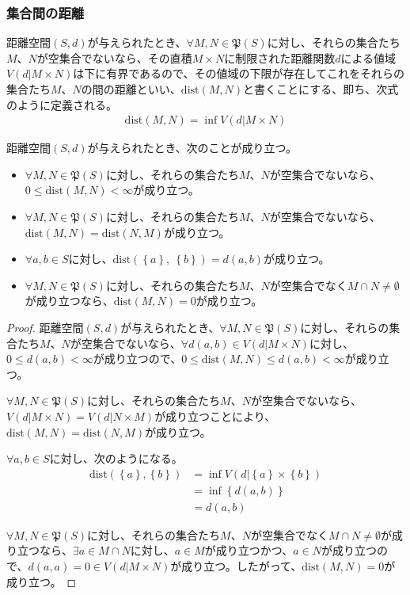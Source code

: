 \documentclass[dvipdfmx]{jsarticle}
\begin{document}
\subsubsection{集合間の距離}%
\begin{dfn}
距離空間$(S,d)$が与えられたとき、$\forall M,N \in \mathfrak{P}(S)$に対し、それらの集合たち$M$、$N$が空集合でないなら、その直積$M \times N$に制限された距離関数$d$による値域$V\left( d|M \times N \right)$は下に有界であるので、その値域の下限が存在してこれをそれらの集合たち$M$、$N$の間の距離といい、$\mathrm{dist}(M,N)$と書くことにする、即ち、次式のように定義される。
\begin{align*}
\mathrm{dist}(M,N) = \inf{V\left( d|M \times N \right)}
\end{align*}
\end{dfn}
\begin{thm}\label{8.2.3.4} 距離空間$(S,d)$が与えられたとき、次のことが成り立つ。
\begin{itemize}
\item
  $\forall M,N \in \mathfrak{P}(S)$に対し、それらの集合たち$M$、$N$が空集合でないなら、$0 \leq \mathrm{dist}(M,N) < \infty$が成り立つ。
\item
  $\forall M,N \in \mathfrak{P}(S)$に対し、それらの集合たち$M$、$N$が空集合でないなら、$\mathrm{dist}(M,N) = \mathrm{dist}(N,M)$が成り立つ。
\item
  $\forall a,b \in S$に対し、$\mathrm{dist}\left( \left\{ a \right\},\ \left\{ b \right\} \right) = d(a,b)$が成り立つ。
\item
  $\forall M,N \in \mathfrak{P}(S)$に対し、それらの集合たち$M$、$N$が空集合でなく$M \cap N \neq \emptyset$が成り立つなら、$\mathrm{dist}(M,N) = 0$が成り立つ。
\end{itemize}
\end{thm}
\begin{proof}
距離空間$(S,d)$が与えられたとき、$\forall M,N \in \mathfrak{P}(S)$に対し、それらの集合たち$M$、$N$が空集合でないなら、$\forall d(a,b) \in V\left( d|M \times N \right)$に対し、$0 \leq d(a,b) < \infty$が成り立つので、$0 \leq \mathrm{dist}(M,N) \leq d(a,b) < \infty$が成り立つ。\par
$\forall M,N \in \mathfrak{P}(S)$に対し、それらの集合たち$M$、$N$が空集合でないなら、$V\left( d|M \times N \right) = V\left( d|N \times M \right)$が成り立つことにより、$\mathrm{dist}(M,N) = \mathrm{dist}(N,M)$が成り立つ。\par
$\forall a,b \in S$に対し、次のようになる。
\begin{align*}
\mathrm{dist}\left( \left\{ a \right\},\left\{ b \right\} \right) &= \inf{V\left( d|\left\{ a \right\} \times \left\{ b \right\} \right)}\\
&= \inf\left\{ d(a,b) \right\}\\
&= d(a,b)
\end{align*}\par
$\forall M,N \in \mathfrak{P}(S)$に対し、それらの集合たち$M$、$N$が空集合でなく$M \cap N \neq \emptyset$が成り立つなら、$\exists a \in M \cap N$に対し、$a \in M$が成り立つかつ、$a \in N$が成り立つので、$d(a,a) = 0 \in V\left( d|M \times N \right)$が成り立つ。したがって、$\mathrm{dist}(M,N) = 0$が成り立つ。
\end{proof}
\end{document}
